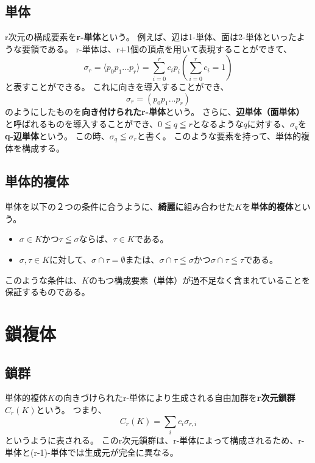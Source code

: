 \documentclass[a4paper]{jsreport}
\begin{document}
            \subsection*{単体}
                r次元の構成要素を\textbf{r-単体}という。
                例えば、辺は1-単体、面は2-単体といったような要領である。
                r-単体は、r+1個の頂点を用いて表現することができて、
                \begin{equation}
                    \sigma_r = \langle p_0p_1 \dots p_r \rangle = \sum_{i=0}^{r} c_i p_i \left( \sum_{i=0}^{r} c_i = 1 \right)
                \end{equation}
                と表すことができる。
                これに向きを導入することができ、
                \begin{equation}
                    \sigma_r = ( p_0p_1 \dots p_r )
                \end{equation}
                のようにしたものを\textbf{向き付けられたr-単体}という。
                さらに、\textbf{辺単体（面単体）}と呼ばれるものを導入することができ、$0 \leqq q \leqq r$となるような$q$に対する、$\sigma_q$を\textbf{q-辺単体}という。
                この時、$\sigma_q \leqq \sigma_r$と書く。
                このような要素を持って、単体的複体を構成する。

            \subsection*{単体的複体}
                単体を以下の２つの条件に合うように、\textbf{綺麗に}組み合わせた$K$を\textbf{単体的複体}という。
                \begin{itemize}
                  \item $\sigma \in K$かつ$\tau \leqq \sigma$ならば、$\tau \in K$である。
                  \item $\sigma, \tau \in K$に対して、$\sigma \cap \tau = \emptyset$または、$\sigma \cap \tau \leqq \sigma$かつ$\sigma \cap \tau \leqq \tau$である。
                \end{itemize}
                このような条件は、$K$のもつ構成要素（単体）が過不足なく含まれていることを保証するものである。

        \section{鎖複体}
            \subsection*{鎖群}
                単体的複体$K$の向きづけられたr-単体により生成される自由加群を\textbf{r次元鎖群}$C_r(K)$という。
                つまり、
                \begin{equation}
                    C_r(K) = \sum_{i} c_i \sigma_{r, i}
                \end{equation}
                というように表される。
                このr次元鎖群は、r-単体によって構成されるため、r-単体と(r-1)-単体では生成元が完全に異なる。
\end{document}
